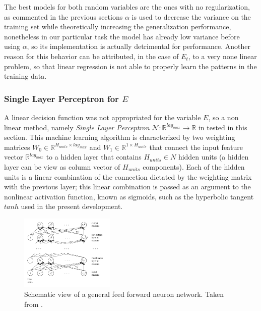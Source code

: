 The best models for both random variables are the ones with no regularization, as commented in the previous sections $\alpha$ is used to decrease the variance on the training set while theoretically increasing the generalization performance, nonetheless in our particular task the model has already low variance before using $\alpha$, so its implementation is actually detrimental for performance. Another reason for this behavior can be attributed, in the case of $E_{t}$, to a very none linear problem, so that linear regression is not able to properly learn the patterns in the training data. \\



\subsubsection{Single Layer Perceptron for $E$}

A linear decision function was not appropriated for the variable $E$, so a non linear method, namely \emph{Single Layer Perceptron}  $\mathcal{N}:\mathbb{R}^{lag_{max}} \rightarrow \mathbb{R}$ in tested in this section. This machine learning algorithm is characterized by two weighting matrices $W_{0} \in \mathbb{R}^{H_{units}\times lag_{max}} $ and $W_{1} \in \mathbb{R}^{1 \times H_{units}}$ that connect the input feature vector $\mathbb{R}^{lag_{max}}$ to a hidden layer that contains $H_{units} \in N$ hidden units (a hidden layer can be view as column vector of $H_{units}$ components). Each of the hidden units is a linear combination of the connection dictated by the weighting matrix with the previous layer; this linear combination is passed as an argument to the nonlinear activation function, known as sigmoids, such as the hyperbolic tangent $tanh$ used in the present development. 

\begin{figure}[htpb!] %
	\centering %
	\includegraphics[width=0.4\textwidth]{data/nn.png} %
	\caption{Schematic view of a general feed forward neuron network. Taken from  \cite{ml_jacobs_h}.} %
	\label{fig:nn} %
\end{figure}

